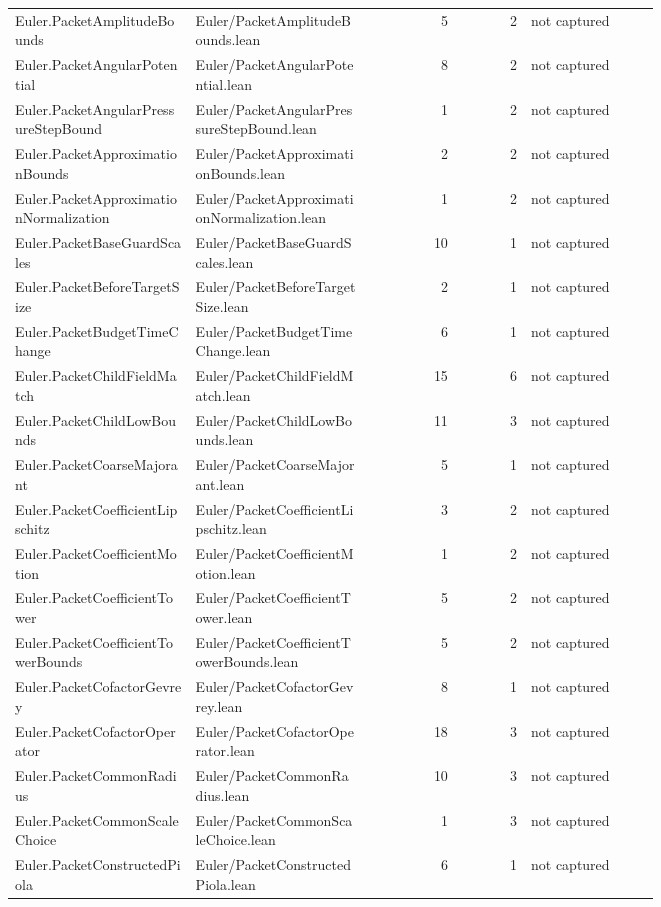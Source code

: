 \documentclass[10pt]{article}
\begin{document}
\begin{longtable}{p{0.28\linewidth}p{0.27\linewidth}r r p{0.20\linewidth}}
Euler.PacketAmplitudeBounds & Euler/PacketAmplitudeBounds.lean & 5 & 2 & not captured\\
Euler.PacketAngularPotential & Euler/PacketAngularPotential.lean & 8 & 2 & not captured\\
Euler.PacketAngularPressureStepBound & Euler/PacketAngularPressureStepBound.lean & 1 & 2 & not captured\\
Euler.PacketApproximationBounds & Euler/PacketApproximationBounds.lean & 2 & 2 & not captured\\
Euler.PacketApproximationNormalization & Euler/PacketApproximationNormalization.lean & 1 & 2 & not captured\\
Euler.PacketBaseGuardScales & Euler/PacketBaseGuardScales.lean & 10 & 1 & not captured\\
Euler.PacketBeforeTargetSize & Euler/PacketBeforeTargetSize.lean & 2 & 1 & not captured\\
Euler.PacketBudgetTimeChange & Euler/PacketBudgetTimeChange.lean & 6 & 1 & not captured\\
Euler.PacketChildFieldMatch & Euler/PacketChildFieldMatch.lean & 15 & 6 & not captured\\
Euler.PacketChildLowBounds & Euler/PacketChildLowBounds.lean & 11 & 3 & not captured\\
Euler.PacketCoarseMajorant & Euler/PacketCoarseMajorant.lean & 5 & 1 & not captured\\
Euler.PacketCoefficientLipschitz & Euler/PacketCoefficientLipschitz.lean & 3 & 2 & not captured\\
Euler.PacketCoefficientMotion & Euler/PacketCoefficientMotion.lean & 1 & 2 & not captured\\
Euler.PacketCoefficientTower & Euler/PacketCoefficientTower.lean & 5 & 2 & not captured\\
Euler.PacketCoefficientTowerBounds & Euler/PacketCoefficientTowerBounds.lean & 5 & 2 & not captured\\
Euler.PacketCofactorGevrey & Euler/PacketCofactorGevrey.lean & 8 & 1 & not captured\\
Euler.PacketCofactorOperator & Euler/PacketCofactorOperator.lean & 18 & 3 & not captured\\
Euler.PacketCommonRadius & Euler/PacketCommonRadius.lean & 10 & 3 & not captured\\
Euler.PacketCommonScaleChoice & Euler/PacketCommonScaleChoice.lean & 1 & 3 & not captured\\
Euler.PacketConstructedPiola & Euler/PacketConstructedPiola.lean & 6 & 1 & not captured\\

\end{longtable}
\end{document}
